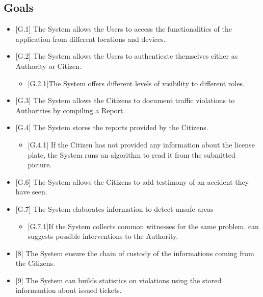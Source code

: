 \documentclass{report}
\begin{document}
\subsection{Goals}
\begin{itemize}
    \item {[G.1]} The System allows the Users to access the functionalities of the application from different locations and devices.
    \item {[G.2]} The System allows the Users to authenticate themselves either as Authority or Citizen.
    \begin{itemize}
    		\item {[G.2.1]}The System offers different levels of visibility to different roles.
    \end{itemize}
    \item {[G.3]} The System allows the Citizens to document traffic violations to Authorities by compiling a Report.
    \item {[G.4]} The System stores the reports provided by the Citizens.
    \begin{itemize}
    		\item {[G.4.1]} If the Citizen has not provided any information about the license plate, the System runs an algorithm 			to read it from the submitted picture.
    	\end{itemize}     

    \item {[G.6]} The System allows the Citizens to add testimony of an accident they have seen.
    \item {[G.7]} The System elaborates information to detect unsafe areas
    \begin{itemize}
    		\item {[G.7.1]}If the System collects common witnesses for the same problem, can suggests possible interventions to the 		Authority.
    \end{itemize}    
    \item {[8]} The System ensure the chain of custody of the informations coming from the Citizens.
    \item{[9]} The System can builds statistics on violations using the stored informantion about issued tickets.
\end{itemize}
\end{document}
